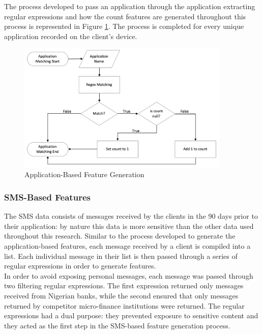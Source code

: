 The process developed to pass an application through the application extracting regular expressions and how the count features are generated throughout this process is represented in Figure \ref{fig:app_features}. The process is completed for every unique application recorded on the client's device. 


\vspace{10 pt}

\begin{figure}[!htb]
\centering
\includegraphics[width=0.9\textwidth]{images/app_feats.png}
\caption{Application-Based Feature Generation}
\label{fig:app_features}
\end{figure}

\newpage

\subsubsection{SMS-Based Features}

The SMS data consists of messages received by the clients in the 90 days prior to their application: by nature this data is more sensitive than the other data used throughout this research. Similar to the process developed to generate the application-based features, each message received by a client is compiled into a list. Each individual message in their list is then passed through a series of regular expressions in order to generate features.  \\

In order to avoid exposing personal messages, each message was passed through two filtering regular expressions. The first expression returned only messages received from Nigerian banks, while the second ensured that only messages returned by competitor micro-finance institutions were returned. The regular expressions had a dual purpose: they prevented exposure to sensitive content and they acted as the first step in the SMS-based feature generation process. \\

